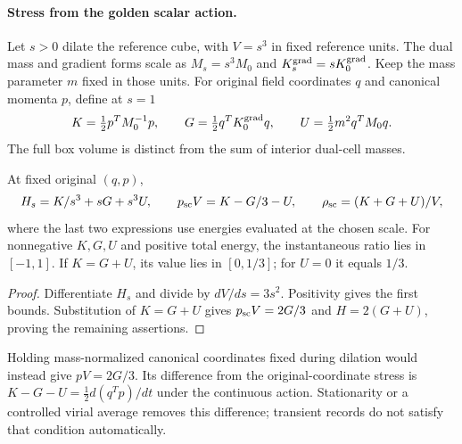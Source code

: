 \paragraph{Stress from the golden scalar action.}
Let $s>0$ dilate the reference cube, with $V=s^3$ in fixed reference units.
The dual mass and gradient forms scale as $M_s=s^3M_0$ and
$K_s^{\rm grad}=sK_0^{\rm grad}$. Keep the mass parameter $m$ fixed in
those units. For original field coordinates $q$ and canonical momenta $p$,
define at $s=1$
\[
 K=\tfrac12p^TM_0^{-1}p,\qquad
 G=\tfrac12q^TK_0^{\rm grad}q,\qquad
 U=\tfrac12m^2q^TM_0q.
\]
The full box volume is distinct from the sum of interior dual-cell masses.

\begin{proposition}
\label{prop:finite-eos-scalar}
At fixed original $(q,p)$,
\[
 H_s=K/s^3+sG+s^3U,\qquad
 p_{\rm sc}V=K-G/3-U,\qquad \rho_{\rm sc}=(K+G+U)/V,
\]
where the last two expressions use energies evaluated at the chosen scale.
For nonnegative $K,G,U$ and positive total energy, the instantaneous ratio
lies in $[-1,1]$. If $K=G+U$, its value lies in $[0,1/3]$; for $U=0$
it equals $1/3$.
\end{proposition}
\begin{proof}
Differentiate $H_s$ and divide by $dV/ds=3s^2$. Positivity gives the
first bounds. Substitution of $K=G+U$ gives $p_{\rm sc}V=2G/3$ and
$H=2(G+U)$, proving the remaining assertions.
\end{proof}
Holding mass-normalized canonical coordinates fixed during dilation would
instead give $pV=2G/3$. Its difference from the original-coordinate stress
is $K-G-U=\frac12d(q^Tp)/dt$ under the continuous action. Stationarity or
a controlled virial average removes this difference; transient records do
not satisfy that condition automatically.

